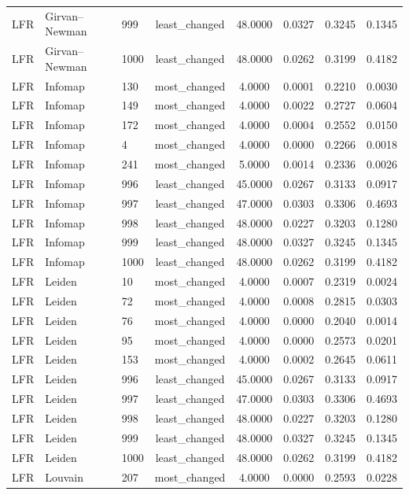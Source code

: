 \begin{longtable}{lllccccc}
LFR & Girvan--Newman & 999 & least\_changed & 48.0000 & 0.0327 & 0.3245 & 0.1345 \\
LFR & Girvan--Newman & 1000 & least\_changed & 48.0000 & 0.0262 & 0.3199 & 0.4182 \\
LFR & Infomap & 130 & most\_changed & 4.0000 & 0.0001 & 0.2210 & 0.0030 \\
LFR & Infomap & 149 & most\_changed & 4.0000 & 0.0022 & 0.2727 & 0.0604 \\
LFR & Infomap & 172 & most\_changed & 4.0000 & 0.0004 & 0.2552 & 0.0150 \\
LFR & Infomap & 4 & most\_changed & 4.0000 & 0.0000 & 0.2266 & 0.0018 \\
LFR & Infomap & 241 & most\_changed & 5.0000 & 0.0014 & 0.2336 & 0.0026 \\
LFR & Infomap & 996 & least\_changed & 45.0000 & 0.0267 & 0.3133 & 0.0917 \\
LFR & Infomap & 997 & least\_changed & 47.0000 & 0.0303 & 0.3306 & 0.4693 \\
LFR & Infomap & 998 & least\_changed & 48.0000 & 0.0227 & 0.3203 & 0.1280 \\
LFR & Infomap & 999 & least\_changed & 48.0000 & 0.0327 & 0.3245 & 0.1345 \\
LFR & Infomap & 1000 & least\_changed & 48.0000 & 0.0262 & 0.3199 & 0.4182 \\
LFR & Leiden & 10 & most\_changed & 4.0000 & 0.0007 & 0.2319 & 0.0024 \\
LFR & Leiden & 72 & most\_changed & 4.0000 & 0.0008 & 0.2815 & 0.0303 \\
LFR & Leiden & 76 & most\_changed & 4.0000 & 0.0000 & 0.2040 & 0.0014 \\
LFR & Leiden & 95 & most\_changed & 4.0000 & 0.0000 & 0.2573 & 0.0201 \\
LFR & Leiden & 153 & most\_changed & 4.0000 & 0.0002 & 0.2645 & 0.0611 \\
LFR & Leiden & 996 & least\_changed & 45.0000 & 0.0267 & 0.3133 & 0.0917 \\
LFR & Leiden & 997 & least\_changed & 47.0000 & 0.0303 & 0.3306 & 0.4693 \\
LFR & Leiden & 998 & least\_changed & 48.0000 & 0.0227 & 0.3203 & 0.1280 \\
LFR & Leiden & 999 & least\_changed & 48.0000 & 0.0327 & 0.3245 & 0.1345 \\
LFR & Leiden & 1000 & least\_changed & 48.0000 & 0.0262 & 0.3199 & 0.4182 \\
LFR & Louvain & 207 & most\_changed & 4.0000 & 0.0000 & 0.2593 & 0.0228 \\

\end{longtable}
